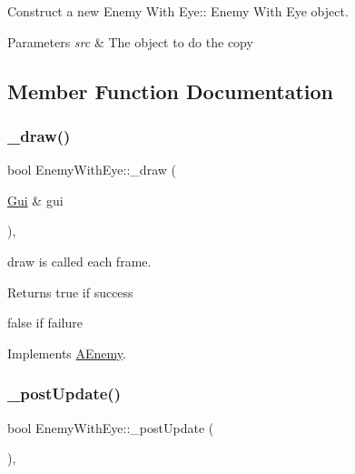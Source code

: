Construct a new Enemy With Eye\+:\+: Enemy With Eye object. 


\begin{DoxyParams}{Parameters}
{\em src} & The object to do the copy \\
\hline
\end{DoxyParams}


\subsection{Member Function Documentation}
\mbox{\label{class_enemy_with_eye_a34caaf4c68b5ad06059fe61d9d1f8026}} 
\subsubsection{\texorpdfstring{\+\_\+draw()}{\_draw()}}
{\footnotesize\ttfamily bool Enemy\+With\+Eye\+::\+\_\+draw (\begin{DoxyParamCaption}\item[{\hyperlink{class_gui}{Gui} \&}]{gui }\end{DoxyParamCaption})\hspace{0.3cm}{\ttfamily [protected]}, {\ttfamily [virtual]}}



draw is called each frame. 

\begin{DoxyReturn}{Returns}
true if success 

false if failure 
\end{DoxyReturn}


Implements \hyperlink{class_a_enemy_a70e3638b5ed8ecea2a087ffe16510dd2}{A\+Enemy}.

\mbox{\label{class_enemy_with_eye_a489d03612e65839940c5f468f3efdbe7}} 
\subsubsection{\texorpdfstring{\+\_\+post\+Update()}{\_postUpdate()}}
{\footnotesize\ttfamily bool Enemy\+With\+Eye\+::\+\_\+post\+Update (\begin{DoxyParamCaption}{ }\end{DoxyParamCaption})\hspace{0.3cm}{\ttfamily [protected]}, {\ttfamily [virtual]}}



